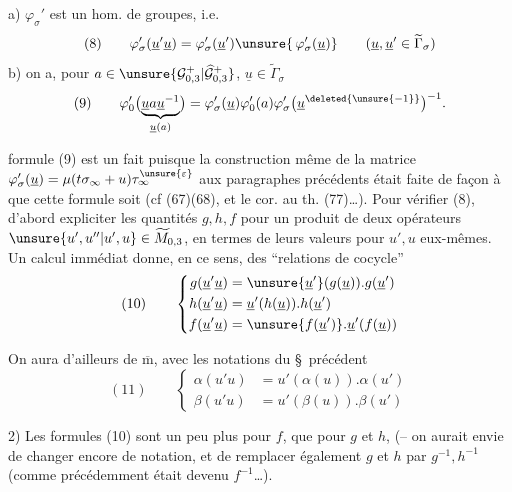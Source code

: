 a) $\varphi_\sigma'$ est un hom. de groupes, i.e.
\[
(8)\qquad\varphi_\sigma'(\underline u'\underline u)=\varphi_\sigma'(\underline u')\unsure{\,\varphi_\sigma'(\underline u)}\qquad(\underline u,\underline u'\in\widetilde\Gamma_\sigma)
\]
b) on a, pour $a\in\unsure{\mathcal G_{0,3}^{+}|\widehat{\mathcal G}_{0,3}^{+}}$, $\underline u\in\widetilde\Gamma_\sigma$
\[
(9)\qquad\varphi_0'\bigl(\underbrace{\underline u a\underline u^{-1}}_{\underline u(a)}\bigr)=\varphi_\sigma'(\underline u)\varphi_0'(a)\varphi_\sigma'\bigl(\underline u^{\deleted{\unsure{-1}}}\bigr)^{-1}.
\]

 formule (9) est un fait   puisque la  construction même de la matrice $\varphi_\sigma'(\underline u)=\mu(t\sigma_\infty+u)\tau_\infty^{\unsure{\varepsilon}}$ aux paragraphes précédents était faite de façon à   que cette formule soit  (cf (67)(68), et le cor. au th. (77)\ldots). Pour vérifier (8),   d'abord expliciter les quantités $g,h,f$ pour un produit de deux opérateurs $\unsure{u',u''|u',u}\in\widetilde M_{0,3}$, en termes de leurs valeurs pour $u',u$ eux-mêmes. Un calcul immédiat donne, en ce sens, des ``relations de cocycle''
\[
(10)\qquad\left\{\begin{aligned}
g(\underline u'\underline u)&=\unsure{\underline u'}(g(\underline u)).g(\underline u')\\
h(\underline u'\underline u)&=\underline u'(h(\underline u)).h(\underline u')\\
f(\underline u'\underline u)&=\unsure{f(\underline u')}.\underline u'(f(\underline u))
\end{aligned}\right.
\]


 On aura d'ailleurs de $\overline{\mathrm m}$, avec les notations du \S\ précédent
\[
(11)\qquad\left\{\begin{aligned}
\alpha(u'u)&=u'(\alpha(u)).\alpha(u')\\
\beta(u'u)&=u'(\beta(u)).\beta(u')
\end{aligned}\right.
\]

 2) Les formules (10) sont un peu plus  pour $f$, que pour $g$ et $h$,  (-- on aurait envie de changer encore de notation, et de remplacer également $g$ et $h$ par $g^{-1},h^{-1}$ (comme précédemment  était devenu $f^{-1}$\ldots).

